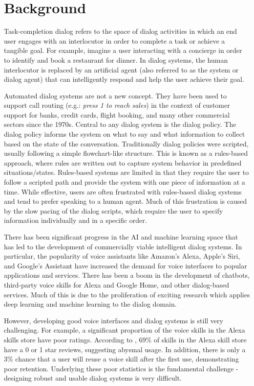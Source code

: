 \section{Background}

Task-completion dialog refers to the space of dialog activities in which an end user engages with an interlocutor in order to complete a task or achieve a tangible goal. For example, imagine a user interacting with a concierge in order to identify and book a restaurant for dinner. In dialog systems, the human interlocutor is replaced by an artificial agent (also referred to as the system or dialog agent) that can intelligently respond and help the user achieve their goal.

Automated dialog systems are not a new concept. They have been used to support call routing (e.g.: \textit{press 1 to reach sales}) in the context of customer support for banks, credit cards, flight booking, and many other commercial sectors since the 1970s. Central to any dialog system is the dialog policy. The dialog policy informs the system on what to say and what information to collect based on the state of the conversation. Traditionally dialog policies were scripted, usually following a simple flowchart-like structure. This is known as a rules-based approach, where rules are written out to capture system behavior in predefined situations/states. Rules-based systems are limited in that they require the user to follow a scripted path and provide the system with one piece of information at a time. While effective, users are often frustrated with rules-based dialog systems and tend to prefer speaking to a human agent. Much of this frustration is caused by the slow pacing of the dialog scripts, which require the user to specify information individually and in a specific order. 

There has been significant progress in the AI and machine learning space that has led to the development of commercially viable intelligent dialog systems. In particular, the popularity of voice assistants like Amazon's Alexa, Apple's Siri, and Google's Assistant have increased the demand for voice interfaces to popular applications and services. There has been a boom in the development of chatbots, third-party voice skills for Alexa and Google Home, and other dialog-based services. Much of this is due to the proliferation of exciting research which applies deep learning and machine learning to the dialog domain. 

However, developing good voice interfaces and dialog systems is still very challenging. For example, a significant proportion of the voice skills in the Alexa skills store have poor ratings. According to  \cite{rey_2017}, 69\% of skills in the Alexa skill store have a 0 or 1  star reviews, suggesting abysmal usage. In addition, there is only a 3\% chance that a user will reuse a voice skill after the first use, demonstrating poor retention. Underlying these poor statistics is the fundamental challenge - designing robust and usable dialog systems is very difficult. 
 
